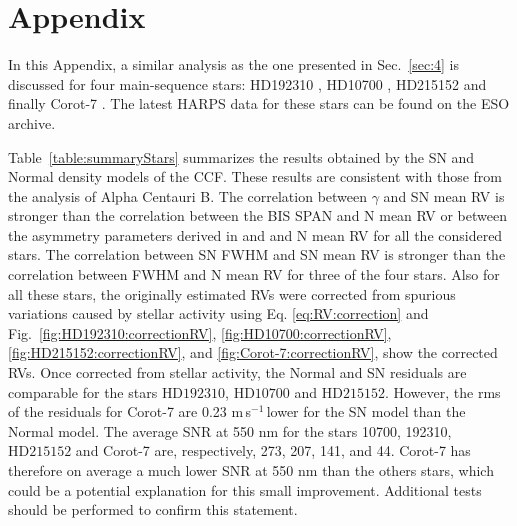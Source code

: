 \documentclass{aa}
\def\ms{\hbox{\,m\,s$^{-1}$}}         %
\newcommand{\xavier}[1]{{\color{blue}[[\textbf{Xavier: }#1]]}}
\begin{document}
\appendix
\section{Appendix} \label{appendix}

In this Appendix, a similar analysis as the one presented in Sec.~\ref{sec:4} is discussed for four main-sequence stars: HD192310 \citep[K2V,][]{Pepe-2011}, HD10700 \citep[G8V,][]{Feng:2017ac}, HD215152 \citep[K3V,][]{Delisle:2018aa} and finally Corot-7 \citep[K0V,][]{Haywood-2014}. The latest HARPS data for these stars can be found on the ESO archive.

Table~\ref{table:summaryStars} summarizes the results obtained by the SN and Normal density models of the CCF. 
These results are consistent with those from the analysis of Alpha Centauri B. 
The correlation between $\gamma$ and SN mean RV is stronger than the correlation between the BIS SPAN and N mean RV or between the asymmetry parameters derived in \citet{Boisse-2009} and \citet{Figueira-2013} and N mean RV for all the considered stars. 
The correlation between SN FWHM and SN mean RV is stronger than the correlation between FWHM and N mean RV for three of the four stars.  
Also for all these stars, the originally estimated RVs were corrected from spurious variations caused by stellar activity using Eq. \ref{eq:RV:correction} and Fig.~\ref{fig:HD192310:correctionRV}, \ref{fig:HD10700:correctionRV}, \ref{fig:HD215152:correctionRV}, and \ref{fig:Corot-7:correctionRV}, show the corrected RVs. 
Once corrected from stellar activity, the Normal and SN residuals are comparable for the stars $\text{HD}192310$, $\text{HD}10700$ and $\text{HD}215152$.
However, the rms of the residuals for Corot-7 are 0.23\,\ms\,lower for the SN model than the Normal model.  %
The average SNR at 550 nm for the stars 10700, 192310, $\text{HD}215152$ and Corot-7 are, respectively, 273, 207, 141, and 44.
Corot-7 has therefore on average a much lower SNR at 550 nm than the others stars, which could be a potential explanation for this small improvement. Additional tests should be performed to confirm this statement. 
\end{document}
